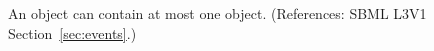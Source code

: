 An \Event object can contain at most one \ListOfEventAssignments
object. (References: SBML L3V1 Section~\ref{sec:events}.)
